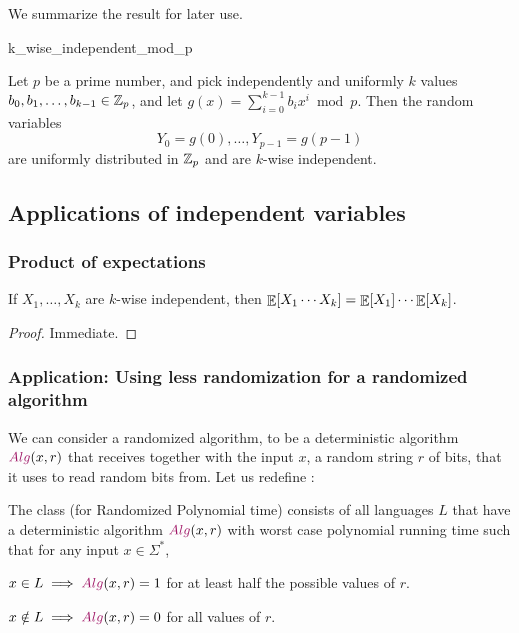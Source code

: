 We summarize the result for later use.

\begin{fragment}{k_wise_independent_mod_p}
    \begin{theorem}
        Let $p$ be a prime number, and pick independently and
        uniformly $k$ values $b_0, b_1, \ldots, b_{k-1} \in \mathbb{Z}_p$,
        and let
        $g(x) = \sum_{i=0}^{k-1} b_i x^i \bmod p$. Then the
        random variables
        \begin{equation*}
            Y_0 = g(0), \ldots, Y_{p-1} = g(p-1)
        \end{equation*}
        are uniformly distributed in $\mathbb{Z}_p$ and are $k$-wise independent.
    \end{theorem}
\end{fragment}

\subsection{Applications of  independent variables}
\subsubsection{Product of expectations}

\begin{lemma}
    If $X_1, \ldots, X_k$ are $k$-wise independent, then
    $\mathop{\mathbb{E}}\!\left[ {X_1 \cdots X_k } \right] =\mathop{\mathbb{E}}\!\left[ {X_1} \right] \cdots \mathop{\mathbb{E}}\!\left[ {X_k} \right]$.
\end{lemma}
\begin{proof}
    Immediate.
\end{proof}

\subsubsection{Application: Using less randomization %
   for a randomized %
   algorithm}

We can consider a randomized algorithm, to be a deterministic
algorithm $\Alg(x,r)$ that receives together with the input $x$, a
random string $r$ of bits, that it uses to read random bits from.  Let
us redefine :
\begin{defn}
    The class  (for Randomized Polynomial time) consists
    of all languages $L$ that have a deterministic algorithm $\Alg
    (x,r)$ with worst case polynomial running time such that for any
    input $x \in \Sigma^*$, \smallskip
    \begin{compactitem}
        \item $x \in L \implies \Alg(x,r) = 1$ for at least half the possible
        values of $r$.
        
        \item $x \notin L \implies \Alg(x,r) = 0$ for all values of
        $r$.
    \end{compactitem}
\end{defn}

